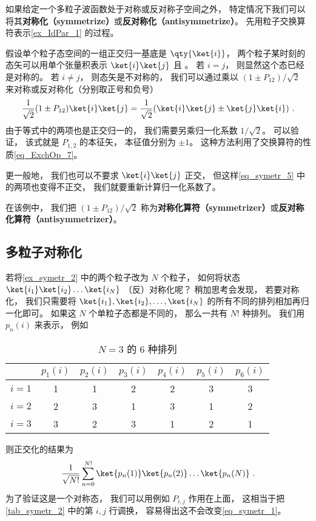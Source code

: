 

如果给定一个多粒子波函数处于对称或反对称子空间之外， 特定情况下我们可以将其\textbf{对称化（symmetrize）}或\textbf{反对称化（antisymmetrize）}。 先用粒子交换算符表示\autoref{ex_IdPar_1} 的过程。

\begin{example}{}\label{ex_symetr_2}
假设单个粒子态空间的一组正交归一基底是 $\qty{\ket{i}}$， 两个粒子某时刻的态矢可以用单个张量积表示 $\ket{i}\ket{j}$ 且 。 若 $i = j$， 则显然这个态已经是对称的。  若 $i \ne j$， 则态矢是不对称的， 我们可以通过乘以 $(1 \pm P_{12})/\sqrt{2}$ 来对称或反对称化（分别取正号和负号）
\begin{equation}\label{eq_symetr_5}
\frac{1}{\sqrt{2}}(1 \pm P_{12})\ket{i}\ket{j} = \frac{1}{\sqrt{2}}(\ket{i}\ket{j} \pm \ket{j}\ket{i})~.
\end{equation}
由于等式中的两项也是正交归一的， 我们需要另乘归一化系数 $1/\sqrt 2$。 可以验证， 该式就是 $P_{1,2}$ 的本征矢， 本征值分别为 $\pm 1$。 这种方法利用了交换算符的性质\autoref{eq_ExchOp_7}。

更一般地， 我们也可以不要求 $\ket{i}\ket{j}$ 正交， 但这样\autoref{eq_symetr_5} 中的两项也变得不正交， 我们就要重新计算归一化系数了。
\end{example}

在该例中， 我们把 $(1 \pm P_{12})/\sqrt{2}$ 称为\textbf{对称化算符（symmetrizer）}或\textbf{反对称化算符（antisymmetrizer）}。

\subsection{多粒子对称化}
若将\autoref{ex_symetr_2} 中的两个粒子改为 $N$ 个粒子， 如何将状态 $\ket{i_1}\ket{i_2}\dots\ket{i_N}$ （反）对称化呢？ 稍加思考会发现， 若要对称化， 我们只需要将 $\ket{i_1},\ket{i_2},\dots,\ket{i_N}$ 的所有不同的排列相加再归一化即可。 如果这 $N$ 个单粒子态都是不同的， 那么一共有 $N!$ 种排列。 我们用 $p_n(i)$ 来表示， 例如
\begin{table}[ht]
\centering
\caption{$N = 3$ 的 6 种排列}\label{tab_symetr_2}
\begin{tabular}{|c|c|c|c|c|c|c|}
\hline
  & $p_1(i)$ & $p_2(i)$ & $p_3(i)$ & $p_4(i)$ & $p_5(i)$ & $p_6(i)$ \\
\hline
$i=1$ & 1 & 1 & 2 & 2 & 3 & 3 \\
\hline
$i=2$ & 2 & 3 & 1 & 3 & 1 & 2 \\
\hline
$i=3$ & 3 & 2 & 3 & 1 & 2 & 1 \\
\hline
\end{tabular}
\end{table}
则正交化的结果为
\begin{equation}\label{eq_symetr_1}
\frac{1}{\sqrt{N!}}\sum_{n = 0}^{N!} \ket{p_n(1)}\ket{p_n(2)}\dots\ket{p_n(N)}~.
\end{equation}
为了验证这是一个对称态， 我们可以用例如 $P_{i,j}$ 作用在上面， 这相当于把\autoref{tab_symetr_2} 中的第 $i,j$ 行调换， 容易得出这不会改变\autoref{eq_symetr_1}。

